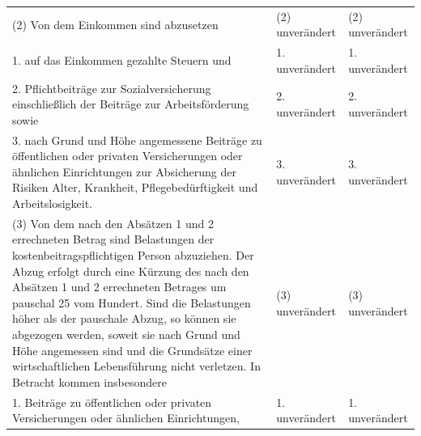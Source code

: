 \documentclass[10pt,a4paper,landscape]{article}
\begin{document}
\begin{longtable}{|L{8.2cm}|L{8.2cm}|L{8.2cm}|}
\hhline{|---|}
(2) Von dem Einkommen sind abzusetzen & (2) unverändert & (2) unverändert \\
\hhline{|---|}
1.  \newline auf das Einkommen gezahlte Steuern und & 1. unverändert & 1. unverändert \\
\hhline{|---|}
2.   \newline Pflichtbeiträge zur Sozialversicherung  \newline einschließlich der Beiträge zur  \newline Arbeitsförderung sowie & 2. unverändert & 2. unverändert \\
\hhline{|---|}
3.   \newline nach Grund und Höhe angemessene  \newline Beiträge zu öffentlichen oder privaten  \newline Versicherungen oder ähnlichen  \newline Einrichtungen zur Absicherung der Risiken  \newline Alter, Krankheit, Pflegebedürftigkeit und  \newline Arbeitslosigkeit. & 3. unverändert & 3. unverändert \\
\hhline{|---|}
(3) Von dem nach den Absätzen 1 und 2  \newline errechneten Betrag sind Belastungen der  \newline kostenbeitragspflichtigen Person  \newline abzuziehen. Der Abzug erfolgt durch eine  \newline Kürzung des nach den Absätzen 1 und 2  \newline errechneten Betrages um pauschal 25 vom  \newline Hundert. Sind die Belastungen höher als  \newline der pauschale Abzug, so können sie  \newline abgezogen werden, soweit sie nach Grund  \newline und Höhe angemessen sind und die  \newline Grundsätze einer wirtschaftlichen  \newline Lebensführung nicht verletzen. In Betracht  \newline kommen insbesondere & (3) unverändert & (3) unverändert \\
\hhline{|---|}
1.   \newline Beiträge zu öffentlichen oder privaten  \newline Versicherungen oder ähnlichen  \newline Einrichtungen, & 1. unverändert & 1. unverändert \\

\end{longtable}
\end{document}
